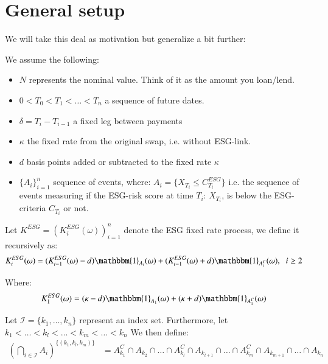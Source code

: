 \newpage 


\section{General setup}
We will take this deal as motivation but generalize a bit further:
\begin{assumption}
We assume the following: 
\begin{itemize}[leftmargin=*]
    \item $N$ represents the nominal value. Think of it as the amount you loan/lend.
    \item $0 < T_{0} < T_{1} < \dots < T_{n}$ a sequence of future dates. 
    \item $\delta = T_{i} - T_{i-1}$ a fixed leg between payments 
    \item $\kappa$ the fixed rate from the original swap, i.e. without ESG-link. 
    \item $d$ basis points added or subtracted to the fixed rate $\kappa$
    \item $\{A_{i}\}_{i=1}^{n}$ sequence of events, where: 
    $A_{i} = \{X_{T_{i}} \leq C_{T_{i}}^{ESG}\}$
    i.e. the sequence of events measuring if the ESG-risk score at time $T_{i}$: $X_{T_{i}}$, is below the ESG-criteria $C_{T_{i}}$ or not. 

\end{itemize}
\end{assumption} 


\begin{definition}
Let $K^{ESG} = (K_{i}^{ESG}(\omega))_{i=1}^{n}$ 
denote the ESG fixed rate process, we define it recursively as: 
\begin{align*}
K_{i}^{ESG}(\omega) &= (K_{i-1}^{ESG}(\omega)-d)\mathbbm{1}_{A_{i}}(\omega)
+ (K_{i-1}^{ESG}(\omega)+d)\mathbbm{1}_{A_{i}^{C}}(\omega), \;\; i\geq 2
\end{align*}

Where:
\begin{align*}
K_{1}^{ESG}(\omega) &= (\kappa - d)\mathbbm{1}_{A_{1}}(\omega)
+ (\kappa + d)\mathbbm{1}_{A_{1}^{C}}(\omega)    
\end{align*}
\end{definition} 

\begin{notation}
Let $\mathcal{I} = \{k_{1}, \dots, k_{n}\}$ represent an index set. Furthermore, let\\ 
$k_{1}< \dots < k_{l} < \dots < k_{m}< \dots < k_{n}$ We then define:
\begin{align*}
\left(
\bigcap_{i\in \mathcal{I}}A_{i}
\right)^{
\{(k_{1}, k_{l}, k_{m})\}
}
&= 
A_{k_{1}}^{C}\cap A_{k_{2}} \cap \dots\cap A_{k_{l}}^{C}\cap
A_{k_{l+1}}\cap \dots \cap A_{k_{m}}^{C}\cap A_{k_{m+1}}\cap \dots \cap A_{k_{n}}
\end{align*}
\end{notation}

